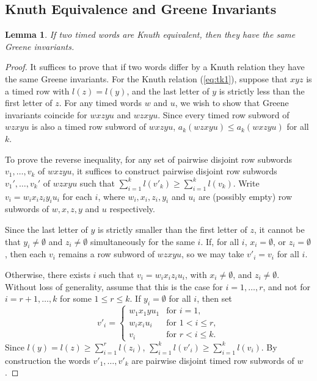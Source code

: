 \documentclass[10pt]{amsproc}
\newtheorem{lemma}[theorem]{Lemma}
\theoremstyle{definition}
\theoremstyle{remark}
\begin{document}
\subsection{Knuth Equivalence and Greene Invariants}
\label{sec:knuth-equiv-green}
\begin{lemma}
  \label{lemma:Knuth-Greene}
  If two timed words are Knuth equivalent, then they have the same Greene invariants.
\end{lemma}
\begin{proof}
  It suffices to prove that if two words differ by a Knuth relation they have the same Greene invariants.
  For the Knuth relation (\ref{eq:tk1}), suppose that $xyz$ is a timed row with $l(z)=l(y)$, and the last letter of $y$ is strictly less than the first letter of $z$.
  For any timed words $w$ and $u$, we wish to show that Greene invariants coincide for $wxzyu$ and $wzxyu$.
  Since every timed row subword of $wzxyu$ is also a timed row subword of $wxzyu$, $a_k(wzxyu)\leq a_k(wxzyu)$ for all $k$.
  
  To prove the reverse inequality, for any set of pairwise disjoint row subwords $v_1,\dotsc,v_k$ of $wxzyu$, it suffices to construct pairwise disjoint row subwords $v_1',\dotsc,v_k'$ of $wzxyu$ such that $\sum_{i=1}^k l(v'_k)\geq \sum_{i=1}^k l(v_k)$.
  Write $v_i=w_ix_iz_iy_iu_i$ for each $i$, where $w_i,x_i,z_i,y_i$ and $u_i$ are (possibly empty) row subwords of $w,x,z,y$ and $u$ respectively.

  Since the last letter of $y$ is strictly smaller than the first letter of $z$, it cannot be that $y_i\neq \emptyset$ and $z_i\neq \emptyset$ simultaneously for the same $i$.
  If, for all $i$, $x_i=\emptyset$, or $z_i=\emptyset$, then each $v_i$ remains a row subword of $wzxyu$, so we may take $v'_i=v_i$ for all $i$.

  Otherwise, there exists $i$ such that $v_i=w_ix_iz_iu_i$, with $x_i\neq \emptyset$, and $z_i\neq \emptyset$.
  Without loss of generality, assume that this is the case for $i=1,\dotsc,r$, and not for $i=r+1,\dotsc,k$ for some $1\leq r\leq k$.
  If $y_i=\emptyset$ for all $i$, then set
  \begin{displaymath}
    v'_i =
    \begin{cases}
      w_1x_1yu_1&\text{for }i=1,\\
      w_ix_iu_i&\text{for }1<i\leq r,\\
      v_i&\text{for }r<i\leq k.
    \end{cases}
  \end{displaymath}
  Since $l(y)=l(z)\geq \sum_{i=1}^r l(z_i)$, $\sum_{i=1}^k l(v'_i)\geq \sum_{i=1}^k l(v_i)$.
  By construction the words $v'_1,\dotsc,v'_k$ are pairwise disjoint timed row subwords of $w$.


\end{proof}
\end{document}
